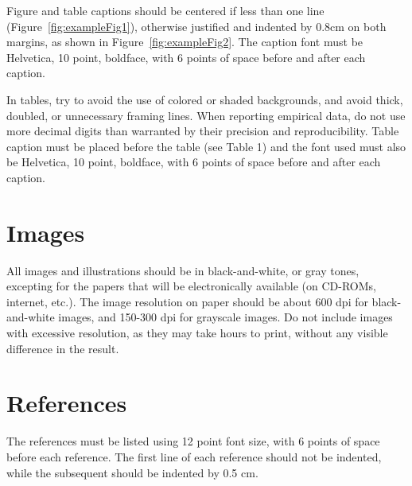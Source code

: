 \documentclass[12pt]{article}
\begin{document}
Figure and table captions should be centered if less than one line
(Figure~\ref{fig:exampleFig1}), otherwise justified and indented by 0.8cm on
both margins, as shown in Figure~\ref{fig:exampleFig2}. The caption font must
be Helvetica, 10 point, boldface, with 6 points of space before and after each
caption.


\label{fig:exampleFig2}

In tables, try to avoid the use of colored or shaded backgrounds, and avoid
thick, doubled, or unnecessary framing lines. When reporting empirical data,
do not use more decimal digits than warranted by their precision and
reproducibility. Table caption must be placed before the table (see Table 1)
and the font used must also be Helvetica, 10 point, boldface, with 6 points of
space before and after each caption.


\section{Images}

All images and illustrations should be in black-and-white, or gray tones,
excepting for the papers that will be electronically available (on CD-ROMs,
internet, etc.). The image resolution on paper should be about 600 dpi for
black-and-white images, and 150-300 dpi for grayscale images.  Do not include
images with excessive resolution, as they may take hours to print, without any
visible difference in the result. 

\section{References}


The references must be listed using 12 point font size, with 6 points of space
before each reference. The first line of each reference should not be
indented, while the subsequent should be indented by 0.5 cm.



\end{document}
